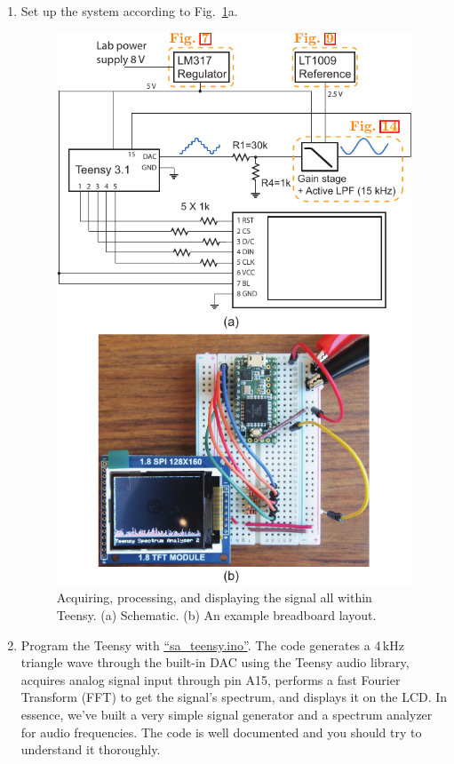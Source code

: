 \documentclass[letterpaper, 11pt]{article}
\begin{document}
\begin{enumerate}
	\item Set up the system according to Fig.~\ref{fig:audio-2}a.
			\begin{figure}[hp]
				\centering
				\includegraphics{audio-2}
				\caption{Acquiring, processing, and displaying the signal all within Teensy. (a) Schematic. (b) An example breadboard layout.}
				\label{fig:audio-2}
			\end{figure}
			
	\item Program the Teensy with \href{https://github.com/ucdart/UCD-EEC134/blob/master/labs/lab1/code/sa_teensy/sa_teensy.ino}{``sa\_teensy.ino''}. The code generates a 4\,kHz triangle wave through the built-in DAC using the Teensy audio library,  acquires analog signal input through pin A15, performs a fast Fourier Transform (FFT) to get the signal's spectrum, and displays it on the LCD. In essence, we've built a very simple signal generator and a spectrum analyzer for audio frequencies. The code is well documented and you should try to understand it thoroughly. 
	

\end{enumerate}
\end{document}
